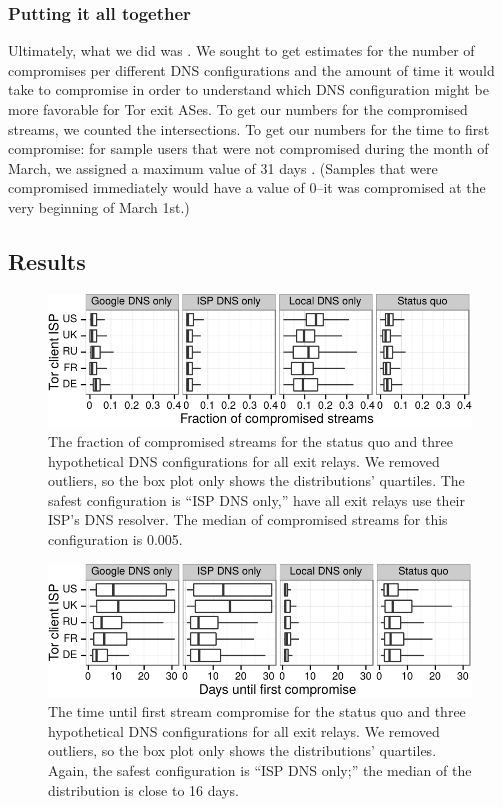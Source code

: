 \subsubsection{Putting it all together}
Ultimately, what we did was .  
We sought to get estimates for the number of compromises per different DNS configurations 
and the amount of time it would take to compromise in order to understand which 
DNS configuration might be more favorable for Tor exit ASes. 
To get our numbers for the compromised streams, 
we counted the intersections.  To get our numbers for the time to first compromise: for 
sample users that were not compromised during the month of March, we assigned a maximum value 
of 31 days . (Samples that were compromised immediately would have a value of 0--it was 
compromised at the very beginning of March 1st.)

\subsection{Results}

\begin{figure}[t]
\centering
\includegraphics[width=0.75\linewidth]{figures/differences-comp-streams.pdf}
\caption{The fraction of compromised streams for the status quo and three
hypothetical DNS configurations for all exit relays.  We removed outliers, so
the box plot only shows the distributions' quartiles.  The safest configuration
is ``ISP DNS only,'' \ie have all exit relays use their ISP's DNS resolver.  The
median of compromised streams for this configuration is 0.005.}
\label{fig:compromised-streams}
\end{figure}

\begin{figure}[t]
\centering
\includegraphics[width=0.75\linewidth]{figures/differences-time-comp.pdf}
\caption{The time until first stream compromise for the status quo and three
hypothetical DNS configurations for all exit relays.  We removed outliers, so
the box plot only shows the distributions' quartiles.  Again, the safest
configuration is ``ISP DNS only;'' the median of the distribution is
close to 16 days.}
\label{fig:time-until-compromise}
\end{figure}

